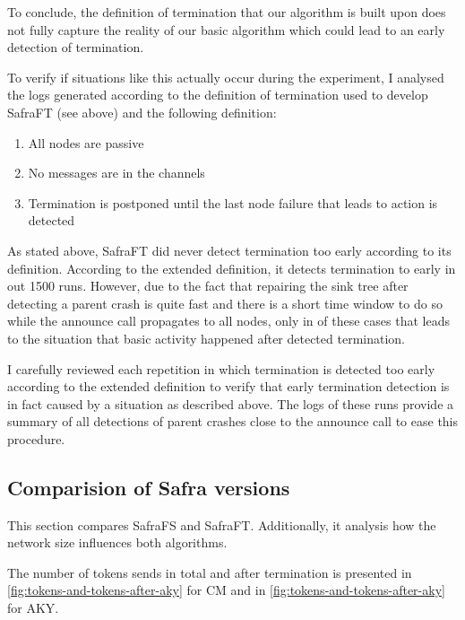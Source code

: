 To conclude, the definition of termination that our algorithm is built upon does not fully capture the reality of our basic algorithm which could lead to an early detection of termination.

To verify if situations like this actually occur during the experiment, I analysed the logs generated according to the definition of termination used to develop SafraFT (see above) and the following definition:
\begin{enumerate}
	\item All nodes are passive
	\item No messages are in the channels
	\item Termination is postponed until the last node failure that leads to action is detected
\end{enumerate}
\label{extended-definition}

As stated above, SafraFT did never detect termination too early according to its definition.
According to the extended definition, it detects termination to early in  out 1500 runs.
However, due to the fact that repairing the sink tree after detecting a parent crash is quite fast and there is a short time window to do so while the announce call propagates to all nodes, only in  of these cases that leads to the situation that basic activity happened after detected termination.


I carefully reviewed each repetition in which termination is detected too early according to the extended definition to verify that early termination detection is in fact caused by a situation as described above.
The logs of these runs provide a summary of all detections of parent crashes close to the announce call to ease this procedure.

\subsection{Comparision of Safra versions}
This section compares SafraFS and SafraFT. 
Additionally, it analysis how the network size influences both algorithms.

The number of tokens sends in total and after termination is presented in \cref{fig:tokens-and-tokens-after-aky} for CM and in \cref{fig:tokens-and-tokens-after-aky} for AKY.

